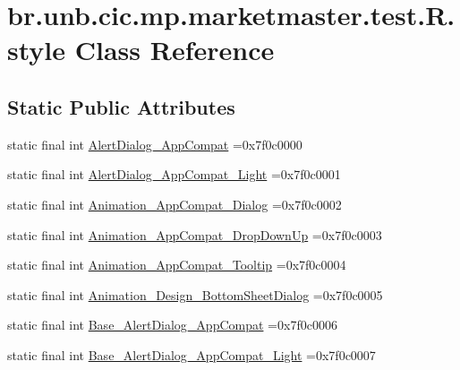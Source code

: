 \hypertarget{classbr_1_1unb_1_1cic_1_1mp_1_1marketmaster_1_1test_1_1R_1_1style}{}\section{br.\+unb.\+cic.\+mp.\+marketmaster.\+test.\+R.\+style Class Reference}
\label{classbr_1_1unb_1_1cic_1_1mp_1_1marketmaster_1_1test_1_1R_1_1style}
\subsection*{Static Public Attributes}
\begin{DoxyCompactItemize}
\item 
static final int \mbox{\hyperlink{classbr_1_1unb_1_1cic_1_1mp_1_1marketmaster_1_1test_1_1R_1_1style_a02ce69772a8a323a610f7f85800d042f}{Alert\+Dialog\+\_\+\+App\+Compat}} =0x7f0c0000
\item 
static final int \mbox{\hyperlink{classbr_1_1unb_1_1cic_1_1mp_1_1marketmaster_1_1test_1_1R_1_1style_a58865e9fa81ace8c5c05b87ef3f8ef30}{Alert\+Dialog\+\_\+\+App\+Compat\+\_\+\+Light}} =0x7f0c0001
\item 
static final int \mbox{\hyperlink{classbr_1_1unb_1_1cic_1_1mp_1_1marketmaster_1_1test_1_1R_1_1style_ad865faf3d4baeb04bf1cc9d2118a870f}{Animation\+\_\+\+App\+Compat\+\_\+\+Dialog}} =0x7f0c0002
\item 
static final int \mbox{\hyperlink{classbr_1_1unb_1_1cic_1_1mp_1_1marketmaster_1_1test_1_1R_1_1style_a479f9e1aa4bab6723f906ad0283b49e0}{Animation\+\_\+\+App\+Compat\+\_\+\+Drop\+Down\+Up}} =0x7f0c0003
\item 
static final int \mbox{\hyperlink{classbr_1_1unb_1_1cic_1_1mp_1_1marketmaster_1_1test_1_1R_1_1style_a2015c7ecbfc37736b78287816ffb16a6}{Animation\+\_\+\+App\+Compat\+\_\+\+Tooltip}} =0x7f0c0004
\item 
static final int \mbox{\hyperlink{classbr_1_1unb_1_1cic_1_1mp_1_1marketmaster_1_1test_1_1R_1_1style_a958f4df29ff47aabd99c3e4466c5c191}{Animation\+\_\+\+Design\+\_\+\+Bottom\+Sheet\+Dialog}} =0x7f0c0005
\item 
static final int \mbox{\hyperlink{classbr_1_1unb_1_1cic_1_1mp_1_1marketmaster_1_1test_1_1R_1_1style_a0d0ff2f32abef619ace1920dfd3db67e}{Base\+\_\+\+Alert\+Dialog\+\_\+\+App\+Compat}} =0x7f0c0006
\item 
static final int \mbox{\hyperlink{classbr_1_1unb_1_1cic_1_1mp_1_1marketmaster_1_1test_1_1R_1_1style_a9bc6e6f2e2f8f09f88356ce6a0f2d831}{Base\+\_\+\+Alert\+Dialog\+\_\+\+App\+Compat\+\_\+\+Light}} =0x7f0c0007

\end{DoxyCompactItemize}
